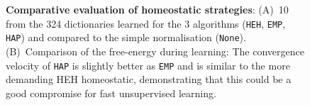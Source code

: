 \documentclass[a4paper, 11pt, draft]{article} %
\newcommand{\seeFig}[1]{Figure~\ref{fig:#1}}%
\begin{document}
\begin{figure}[!ht]%
\caption{
{\bf Comparative evaluation of homeostatic strategies}: %
 {\sf (A)}~10 from the 324 dictionaries learned for the 3 algorithms (\texttt{HEH}, \texttt{EMP}, \texttt{HAP}) and compared to the simple normalisation (\texttt{None}). {\sf (B)}~Comparison of the free-energy during learning: The convergence velocity of \texttt{HAP} is slightly better as \texttt{EMP} and is similar to the more demanding HEH homeostatic, demonstrating that this could be a good compromise for fast unsupervised learning.
\label{fig:HAP}}%
\end{figure}%
\end{document}
